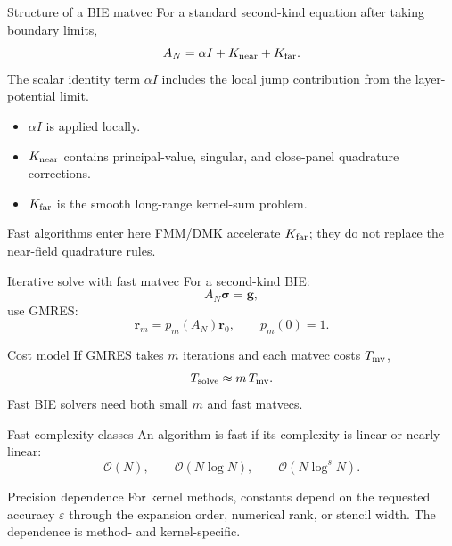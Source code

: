 \documentclass[aspectratio=169,11pt]{beamer}
\newcommand{\cO}{\mathcal{O}}
\newcommand{\eps}{\varepsilon}
\begin{document}
\begin{frame}{Structure of a BIE matvec}
\small
For a standard second-kind equation after taking boundary limits,
\[
A_N=\alpha I+K_{\rm near}+K_{\rm far}.
\]
The scalar identity term $\alpha I$ includes the local jump contribution
from the layer-potential limit.

\begin{itemize}
  \item $\alpha I$ is applied locally.
  \item $K_{\rm near}$ contains principal-value, singular, and close-panel
  quadrature corrections.
  \item $K_{\rm far}$ is the smooth long-range kernel-sum problem.
\end{itemize}

\begin{block}{Fast algorithms enter here}
FMM/DMK accelerate $K_{\rm far}$; they do not replace the near-field
quadrature rules.
\end{block}
\end{frame}

\begin{frame}{Iterative solve with fast matvec}
\small
For a second-kind BIE:
\[
  A_N\bm\sigma=\bm g,
\]
use GMRES:
\[
  \bm r_m=p_m(A_N)\bm r_0,
  \qquad p_m(0)=1.
\]

\begin{block}{Cost model}
If GMRES takes $m$ iterations and each matvec costs $T_{\rm mv}$,
\[
  T_{\rm solve}\approx m\,T_{\rm mv}.
\]
Fast BIE solvers need both small $m$ and fast matvecs.
\end{block}
\end{frame}

\begin{frame}{Fast complexity classes}
\small
An algorithm is fast if its complexity is linear or nearly linear:
\[
  \cO(N),\qquad \cO(N\log N),\qquad
  \cO(N\log^s N).
\]

\begin{block}{Precision dependence}
For kernel methods, constants depend on the requested accuracy $\eps$ through
the expansion order, numerical rank, or stencil width.  The dependence is
method- and kernel-specific.
\end{block}
\end{frame}
\end{document}
